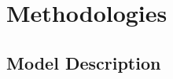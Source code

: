 \documentclass[manuscript,screen,review]{acmart}
\begin{document}






\section{Methodologies} \label{Methodologies}

\subsection{Model Description}
\end{document}
